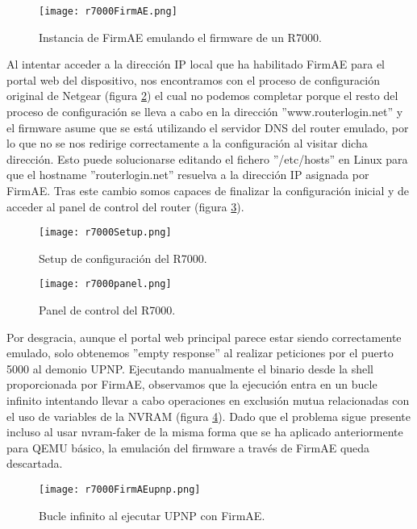 \begin{figure}[H]
    \centering
    \texttt{[image: r7000FirmAE.png]}
    \caption{Instancia de FirmAE emulando el firmware de un R7000.}
    \label{fig:R7000FirmAE}
\end{figure}

Al intentar acceder a la dirección IP local que ha habilitado FirmAE para el portal web del dispositivo, nos encontramos con el proceso de 
configuración original de Netgear (figura \ref{fig:R7000Setup}) el cual no podemos completar porque el resto del proceso de configuración se lleva a cabo
en la dirección ''www.routerlogin.net'' y el firmware asume que se está utilizando el servidor DNS del router emulado, por lo que no se nos redirige 
correctamente a la configuración al visitar dicha dirección. Esto puede solucionarse editando el fichero ''/etc/hosts'' en Linux para que 
el hostname ''routerlogin.net'' resuelva a la dirección IP asignada por FirmAE. Tras este cambio somos capaces de finalizar la configuración inicial 
y de acceder al panel de control del router (figura \ref{fig:R7000panel}). 

\begin{figure}[H]
    \centering
    \texttt{[image: r7000Setup.png]}
    \caption{Setup de configuración del R7000.}
    \label{fig:R7000Setup}
\end{figure}

\begin{figure}[H]
    \centering
    \texttt{[image: r7000panel.png]}
    \caption{Panel de control del R7000.}
    \label{fig:R7000panel}
\end{figure}

Por desgracia, aunque el portal web principal parece estar siendo correctamente emulado, solo obtenemos ''empty response'' al realizar peticiones
por el puerto 5000 al demonio UPNP. Ejecutando manualmente el binario desde la shell proporcionada por FirmAE, observamos que la ejecución 
entra en un bucle infinito intentando llevar a cabo operaciones en exclusión mutua relacionadas con el uso de variables de la NVRAM 
(figura \ref{fig:R7000FirmAEupnp}). Dado que el problema sigue presente incluso al usar nvram-faker\cite{nvram} de la misma forma que se ha aplicado anteriormente para QEMU básico, la emulación del firmware
a través de FirmAE queda descartada.

\begin{figure}[H]
    \centering
    \texttt{[image: r7000FirmAEupnp.png]}
    \caption{Bucle infinito al ejecutar UPNP con FirmAE.}
    \label{fig:R7000FirmAEupnp}
\end{figure}


